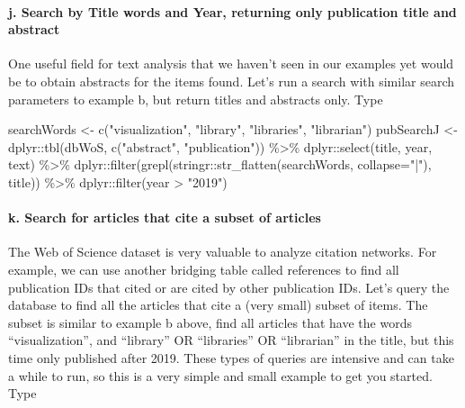 \documentclass[
]{article}
\newenvironment{Shaded}{\begin{snugshade}}{\end{snugshade}}
\newcommand{\AttributeTok}[1]{\textcolor[rgb]{0.77,0.63,0.00}{#1}}
\newcommand{\FunctionTok}[1]{\textcolor[rgb]{0.00,0.00,0.00}{#1}}
\newcommand{\NormalTok}[1]{#1}
\newcommand{\OtherTok}[1]{\textcolor[rgb]{0.56,0.35,0.01}{#1}}
\newcommand{\SpecialCharTok}[1]{\textcolor[rgb]{0.00,0.00,0.00}{#1}}
\newcommand{\StringTok}[1]{\textcolor[rgb]{0.31,0.60,0.02}{#1}}
\begin{document}
\hypertarget{j.-search-by-title-words-and-year-returning-only-publication-title-and-abstract}{%
\paragraph{j. Search by Title words and Year, returning only publication
title and
abstract}\label{j.-search-by-title-words-and-year-returning-only-publication-title-and-abstract}}

One useful field for text analysis that we haven't seen in our examples
yet would be to obtain abstracts for the items found. Let's run a search
with similar search parameters to example b, but return titles and
abstracts only. Type

\begin{Shaded}
\begin{Highlighting}[]
\NormalTok{searchWords }\OtherTok{\textless{}{-}} \FunctionTok{c}\NormalTok{(}\StringTok{"visualization"}\NormalTok{, }\StringTok{"library"}\NormalTok{, }\StringTok{"libraries"}\NormalTok{, }\StringTok{"librarian"}\NormalTok{)}
\NormalTok{pubSearchJ }\OtherTok{\textless{}{-}}\NormalTok{ dplyr}\SpecialCharTok{::}\FunctionTok{tbl}\NormalTok{(dbWoS, }\FunctionTok{c}\NormalTok{(}\StringTok{"abstract"}\NormalTok{, }\StringTok{"publication"}\NormalTok{)) }\SpecialCharTok{\%\textgreater{}\%}
\NormalTok{  dplyr}\SpecialCharTok{::}\FunctionTok{select}\NormalTok{(title, year, text) }\SpecialCharTok{\%\textgreater{}\%}
\NormalTok{  dplyr}\SpecialCharTok{::}\FunctionTok{filter}\NormalTok{(}\FunctionTok{grepl}\NormalTok{(stringr}\SpecialCharTok{::}\FunctionTok{str\_flatten}\NormalTok{(searchWords, }\AttributeTok{collapse=}\StringTok{"|"}\NormalTok{), title)) }\SpecialCharTok{\%\textgreater{}\%}
\NormalTok{  dplyr}\SpecialCharTok{::}\FunctionTok{filter}\NormalTok{(year }\SpecialCharTok{\textgreater{}} \StringTok{"2019"}\NormalTok{)}
\end{Highlighting}
\end{Shaded}

\hypertarget{k.-search-for-articles-that-cite-a-subset-of-articles}{%
\paragraph{k. Search for articles that cite a subset of
articles}\label{k.-search-for-articles-that-cite-a-subset-of-articles}}

The Web of Science dataset is very valuable to analyze citation
networks. For example, we can use another bridging table called
references to find all publication IDs that cited or are cited by other
publication IDs. Let's query the database to find all the articles that
cite a (very small) subset of items. The subset is similar to example b
above, find all articles that have the words ``visualization'', and
``library'' OR ``libraries'' OR ``librarian'' in the title, but this
time only published after 2019. These types of queries are intensive and
can take a while to run, so this is a very simple and small example to
get you started. Type
\end{document}
